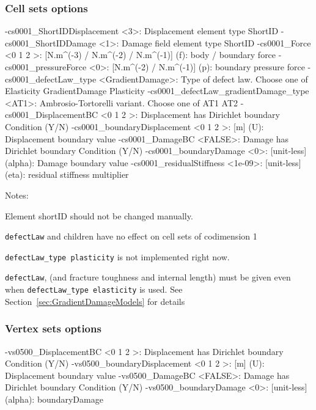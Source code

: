 \documentclass[10pt,oneside]{memoir}
\begin{document}
\subsubsection{Cell sets options}
\small{\begin{boxedverbatim}
-cs0001_ShortIDDisplacement <3>: Displacement element type ShortID 
-cs0001_ShortIDDamage <1>: Damage field element type ShortID 
-cs0001_Force <0 1 2 >: [N.m^(-3) / N.m^(-2) / N.m^(-1)] (f): body / boundary force 
-cs0001_pressureForce <0>: [N.m^(-2) / N.m^(-1)] (p): boundary pressure force 
-cs0001_defectLaw_type <GradientDamage>: Type of defect law. Choose one of 
                                         Elasticity GradientDamage Plasticity
-cs0001_defectLaw_gradientDamage_type <AT1>: Ambrosio-Tortorelli variant. 
                                             Choose one of AT1 AT2
-cs0001_DisplacementBC <0 1 2 >: Displacement has Dirichlet boundary Condition (Y/N) 
-cs0001_boundaryDisplacement <0 1 2 >: [m] (U): Displacement boundary value 
-cs0001_DamageBC <FALSE>: Damage has Dirichlet boundary Condition (Y/N) 
-cs0001_boundaryDamage <0>: [unit-less] (alpha): Damage boundary value 
-cs0001_residualStiffness <1e-09>: [unit-less] (eta): residual stiffness multiplier 
\end{boxedverbatim}}
Notes:
\begin{compactenum}
\item Element shortID should not be changed manually.
\item \verb+defectLaw+ and children have no effect on cell sets of codimension 1
\item \verb+defectLaw_type plasticity+ is not implemented right now.
\item \verb+defectLaw+, (and fracture toughness and internal length) must be given even when \verb+defectLaw_type elasticity+ is used. See Section~\ref{sec:GradientDamageModels} for details
\end{compactenum}


\subsubsection{Vertex sets options}
\small{\begin{boxedverbatim}
-vs0500_DisplacementBC <0 1 2 >: Displacement has Dirichlet boundary Condition (Y/N) 
-vs0500_boundaryDisplacement <0 1 2 >: [m] (U): Displacement boundary value 
-vs0500_DamageBC <FALSE>: Damage has Dirichlet boundary Condition (Y/N) 
-vs0500_boundaryDamage <0>: [unit-less] (alpha): boundaryDamage 
\end{boxedverbatim}}
\end{document}

